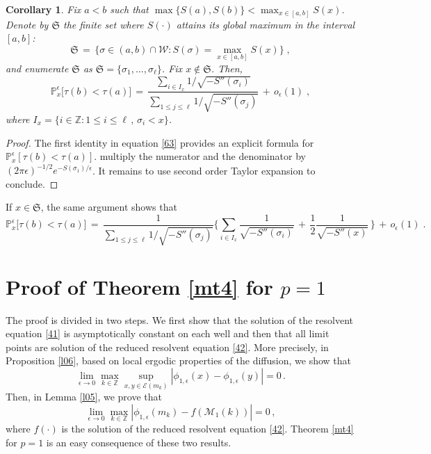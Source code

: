 \documentclass[reqno]{amsart}
\theoremstyle{plain}
\newtheorem{corollary}[theorem]{Corollary}
\theoremstyle{definition}
\newcommand{\mc}[1]{{\mathcal #1}}
\newcommand{\mf}[1]{{\mathfrak #1}}
\newcommand{\bb}[1]{{\mathbb #1}}
\newcommand{\ms}[1]{{\mathscr #1}}
\newcounter{as}[section]
\newcommand{\<}{\langle}
\renewcommand{\>}{\rangle}
\begin{document}
\begin{corollary}
\label{l26}
Fix $a<b$ such that $\max\{S(a), S(b)\} < \max_{x\in [a,b]}
S(x)$. Denote by $\mf S$ the finite set where $S(\cdot)$ attains its
global maximum in the interval $[a,b]$:
\begin{equation*}
\mf S \,=\, \big\{\sigma \in (a,b) \cap \mc W : S(\sigma) = \max_{x\in
[a,b]} S(x) \big\}\;,
\end{equation*}
and enumerate $\mf S$ as $\mf S = \{\sigma_1, \dots,
\sigma_\ell\}$. Fix $x\not\in \mf S$. Then,
\begin{equation*}
\bb P^\epsilon_{x}\big[\tau(b)< \tau(a)\big] \,=\,
\frac{\sum_{i\in I_x}  1/\sqrt{- S''(\sigma_i)}}
{\sum_{1\le  j \le \ell} 1/\sqrt{- S''(\sigma_j)}} \,+\, o_\epsilon (1)\;,
\end{equation*}
where $I_x = \{i\in \bb Z : 1\le i\le\ell\,,\, \sigma_i <x\}$.
\end{corollary}

\begin{proof}
The first identity in equation \eqref{63} provides an explicit formula
for $\bb P^\epsilon_{x} [\tau(b)< \tau(a)]$. multiply the numerator
and the denominator by
$(2\pi \epsilon)^{-1/2} e^{- S(\sigma_1)/\epsilon}$. It remains to use
second order Taylor expansion to conclude.
\end{proof}

If $x\in \mf S$, the same argument shows that
\begin{equation}
\label{89}
\bb P^\epsilon_{x}\big[\tau(b)< \tau(a)\big] \,=\,
\frac{1}
{\sum_{1\le  j \le \ell} 1/\sqrt{- S''(\sigma_j)}}
\Big\{ \sum_{i\in I_x}  \frac{1}{\sqrt{- S''(\sigma_i)}} \,+\,
\frac{1}{2} \frac{1}{\sqrt{- S''(x)} } \, \Big\}
\,+\, o_\epsilon (1)\;.
\end{equation}

\section{Proof of Theorem \ref{mt4} for $p=1$}
\label{sec6}

The proof is divided in two steps. We first show that the solution of
the resolvent equation \eqref{41} is asymptotically constant on each
well and then that all limit points are solution of the reduced
resolvent equation \eqref{42}.  More precisely, in Proposition
\ref{l06}, based on local ergodic properties of the diffusion, we show
that
\begin{equation}
\label{05}
\lim_{\epsilon \to 0} \max_{k\in \bb Z}
\sup_{x,y \in \ms E(m_k)}
|\phi_{1,\epsilon}(x) - \phi_{1,\epsilon}(y)| = 0\,.
\end{equation}
Then, in Lemma \ref{l05}, we prove that
\begin{equation}
\label{06}
\lim_{\epsilon \to 0} \max_{k\in  \bb Z}
|\phi_{1,\epsilon}(m_k) - f(\ms M_1(k))| = 0\,,
\end{equation}
where $f(\cdot)$ is the solution of the reduced resolvent equation
\eqref{42}.  Theorem \ref{mt4} for $p=1$ is an easy consequence of
these two results.
\end{document}
